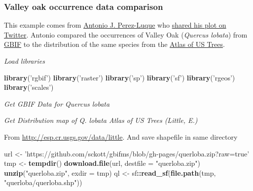 \documentclass[author-year, review, 11pt]{components/elsarticle} %
\newenvironment{Shaded}{\begin{snugshade}}{\end{snugshade}}
\newcommand{\KeywordTok}[1]{\textcolor[rgb]{0.13,0.29,0.53}{\textbf{#1}}}
\newcommand{\DataTypeTok}[1]{\textcolor[rgb]{0.13,0.29,0.53}{#1}}
\newcommand{\DecValTok}[1]{\textcolor[rgb]{0.00,0.00,0.81}{#1}}
\newcommand{\StringTok}[1]{\textcolor[rgb]{0.31,0.60,0.02}{#1}}
\newcommand{\OperatorTok}[1]{\textcolor[rgb]{0.81,0.36,0.00}{\textbf{#1}}}
\newcommand{\NormalTok}[1]{#1}
\begin{document}
\subsubsection{Valley oak occurrence data
comparison}\label{valley-oak-occurrence-data-comparison}

This example comes from \href{https://twitter.com/ajpelu}{Antonio J.
Perez-Luque} who
\href{https://twitter.com/ajpelu/status/473951167567757312}{shared his
plot on Twitter}. Antonio compared the occurrences of Valley Oak
(\emph{Quercus lobata}) from \href{http://www.gbif.org/}{GBIF} to the
distribution of the same species from the
\href{http://esp.cr.usgs.gov/data/little/}{Atlas of US Trees}.

\emph{Load libraries}

\begin{Shaded}
\begin{Highlighting}[]
\KeywordTok{library}\NormalTok{(}\StringTok{'rgbif'}\NormalTok{)}
\KeywordTok{library}\NormalTok{(}\StringTok{'raster'}\NormalTok{)}
\KeywordTok{library}\NormalTok{(}\StringTok{'sp'}\NormalTok{)}
\KeywordTok{library}\NormalTok{(}\StringTok{'sf'}\NormalTok{)}
\KeywordTok{library}\NormalTok{(}\StringTok{'rgeos'}\NormalTok{)}
\KeywordTok{library}\NormalTok{(}\StringTok{'scales'}\NormalTok{)}
\end{Highlighting}
\end{Shaded}

\emph{Get GBIF Data for Quercus lobata}

\begin{Shaded}
\end{Shaded}

\emph{Get Distribution map of Q. lobata Atlas of US Trees (Little, E.)}

From \url{http://esp.cr.usgs.gov/data/little}. And save shapefile in
same directory

\begin{Shaded}
\begin{Highlighting}[]
\NormalTok{url <-}\StringTok{ 'https://github.com/sckott/gbifms/blob/gh-pages/querloba.zip?raw=true'}
\NormalTok{tmp <-}\StringTok{ }\KeywordTok{tempdir}\NormalTok{()}
\KeywordTok{download.file}\NormalTok{(url, }\DataTypeTok{destfile =} \StringTok{"querloba.zip"}\NormalTok{)}
\KeywordTok{unzip}\NormalTok{(}\StringTok{"querloba.zip"}\NormalTok{, }\DataTypeTok{exdir =}\NormalTok{ tmp)}
\NormalTok{ql <-}\StringTok{ }\NormalTok{sf}\OperatorTok{::}\KeywordTok{read_sf}\NormalTok{(}\KeywordTok{file.path}\NormalTok{(tmp, }\StringTok{"querloba/querloba.shp"}\NormalTok{))}
\end{Highlighting}
\end{Shaded}
\end{document}
